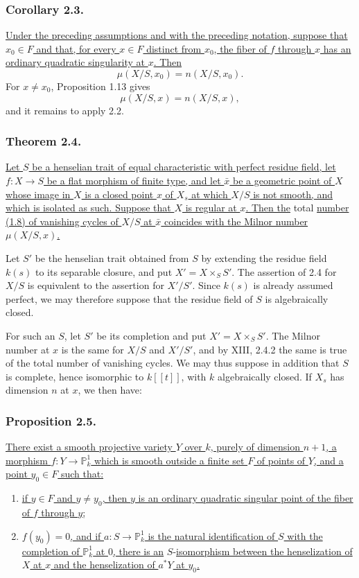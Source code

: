 \subsubsection*{Corollary 2.3.}
\underline{Under the preceding assumptions and with the preceding
notation, suppose that $x_0\in F$ and that, for every
$x\in F$ distinct from $x_0$, the fiber of $f$ through $x$ has an
ordinary quadratic singularity at $x$.  Then}
\[
\mu(X/S,x_0)=n(X/S,x_0).
\]
For $x\ne x_0$, Proposition 1.13 gives
\[
\mu(X/S,x)=n(X/S,x),
\]
and it remains to apply 2.2.

\subsubsection*{Theorem 2.4.}
\underline{Let $S$ be a henselian trait of equal characteristic with
perfect residue field, let $f:X\to S$ be a flat morphism of finite
type, and let $\bar x$ be a geometric point of $X$ whose image in
$X$ is a closed point $x$ of $X_s$ at which $X/S$ is not smooth,
and which is isolated as such.  Suppose that $X$ is regular at $x$.
Then the} total \underline{number (1.8) of vanishing cycles of $X/S$ at $\bar x$
coincides with the Milnor number $\mu(X/S,x)$.}

Let $S'$ be the henselian trait obtained from $S$ by extending the
residue field $k(s)$ to its separable closure, and put
$X'=X\times_S S'$.  The assertion of 2.4 for $X/S$ is equivalent to
the assertion for $X'/S'$.  Since $k(s)$ is already assumed perfect,
we may therefore suppose that the residue field of $S$ is
algebraically closed.

For such an $S$, let $S'$ be its completion and put
$X'=X\times_S S'$.  The Milnor number at $x$ is the same for $X/S$
and $X'/S'$, and by XIII, 2.4.2 the same is true of the total number
of vanishing cycles.  We may thus suppose in addition that $S$ is
complete, hence isomorphic to $k[[t]]$, with $k$ algebraically
closed.  If $X_s$ has dimension $n$ at $x$, we then have:

\subsubsection*{Proposition 2.5.}
\underline{There exist a smooth projective variety $Y$ over $k$,
purely of dimension $n+1$, a morphism
$f:Y\to\mathbb P^1_k$ which is smooth outside a finite set $F$ of
points of $Y$, and a point $y_0\in F$ such that:}
\begin{enumerate}
\item[(a)] \underline{if $y\in F$ and $y\ne y_0$, then $y$ is an
ordinary quadratic singular point of the fiber of $f$ through $y$;}
\item[(b)] \underline{$f(y_0)=0$, and if
$a:S\to\mathbb P^1_k$ is the natural identification of $S$ with the
completion of $\mathbb P^1_k$ at $0$, there is an} $S$-\underline{isomorphism
between the henselization of $X$ at $x$ and the henselization of
$a^*Y$ at $y_0$.}
\end{enumerate}

